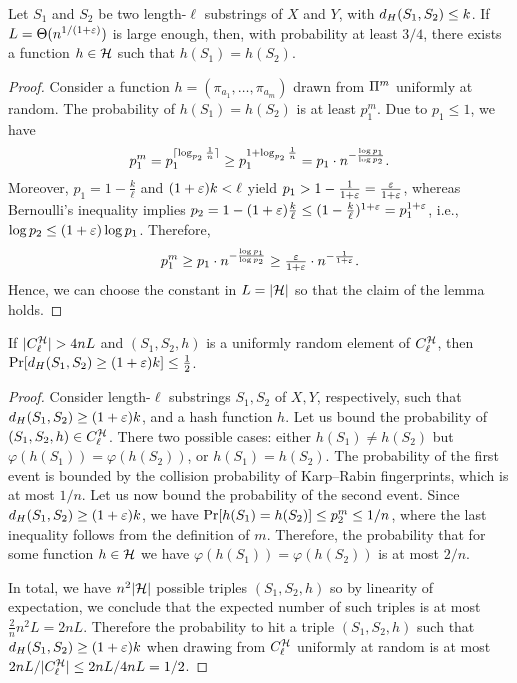 \begin{lemma}\label{lm:hash_function_exists}
Let $S_1$ and $S_2$ be two length-$\ell$ substrings of $X$ and $Y$, with $d_H(S_1, S_2) \le k$. 
If $L=\Theta(n^{1/(1+\varepsilon)})$ is large enough, then, with probability at least $3/4$, there exists a function $h\in \mathcal{H}$ such that $h(S_1)=h(S_2)$.
\end{lemma}
\begin{proof}
Consider a function $h=(\pi_{a_1},\ldots,\pi_{a_m})$ drawn from $\Pi^m$ uniformly at random. The probability of $h(S_1)=h(S_2)$ is at least $p_1^m$.
Due to $p_1 \le 1$, we have \[p_1^m = p_1^{\lceil\log_{p_2}\frac1n\rceil} \ge p_1^{1+\log_{p_2}\frac1n}=p_1\cdot n^{-\frac{\log p_1}{\log p_2}}.\]
Moreover, $p_1 = 1-\frac{k}{\ell}$ and $(1+\varepsilon)k < \ell$ yield $p_1 > 1-\frac{1}{1+\varepsilon}=\frac{\varepsilon}{1+\varepsilon}$,
whereas Bernoulli's inequality implies $p_2 = 1-(1+\varepsilon)\frac{k}{\ell} \le (1-\frac{k}{\ell})^{1+\varepsilon}=p_1^{1+\varepsilon}$,
i.e., $\log p_2  \le (1+\varepsilon)\log p_1$.
Therefore, \[p_1^m \ge p_1\cdot n^{-\frac{\log p_1}{\log p_2}}\ge\tfrac{\varepsilon}{1+\varepsilon}\cdot n^{-\frac{1}{1+\varepsilon}}.\]
Hence, we can choose the constant in $L=|\mathcal{H}|$ so that the claim of the lemma holds.
\end{proof}

\begin{lemma}\label{lm:bad_collisions}
If $|C^{\mathcal{H}}_{\ell}| > 4 nL$ and $(S_1,S_2, h)$ is a uniformly random element of $C^{\mathcal{H}}_{\ell}$, then $\mathrm{Pr}[d_H(S_1,S_2) \ge (1+\varepsilon) k] \le \frac12$.
\end{lemma}
\begin{proof}
Consider length-$\ell$ substrings $S_1, S_2$ of $X, Y$, respectively, such that $d_H(S_1, S_2) \ge (1+\varepsilon)k$, and a hash function $h$. Let us bound the probability of $(S_1,S_2, h) \in C^{\mathcal{H}}_{\ell}$. There two possible cases: either $h(S_1) \neq h(S_2)$ but $\varphi(h(S_1)) = \varphi(h(S_2))$, or $h(S_1) = h(S_2)$. The probability of the first event is bounded by the collision probability of Karp--Rabin fingerprints, which is at most $1/n$. Let us now bound the probability of the second event. Since $d_H (S_1,S_2)\ge (1+\varepsilon)k$, we have $\mathrm{Pr} [h (S_1) = h (S_2)] \le p_2^{m} \le 1/n$,  
where the last inequality follows from the definition of $m$. Therefore, the probability that for some function $h \in \mathcal{H}$ we have $\varphi(h(S_1)) = \varphi(h(S_2))$ is at most $2/n$. 

In total, we have $n^2 |\mathcal{H}|$ possible triples $(S_1, S_2 ,h)$ so by linearity of expectation, we conclude that the expected number of such triples is at most $\frac{2}{n} n^2 L =2n L$. Therefore the probability to hit a triple $(S_1, S_2, h)$ such that $d_H(S_1, S_2) \ge (1+\varepsilon)k$ when drawing from $C^{\mathcal{H}}_{\ell}$ uniformly at random is at most $2nL / |C^{\mathcal{H}}_{\ell}| \le 2nL / 4nL = 1/2$.
\end{proof}

